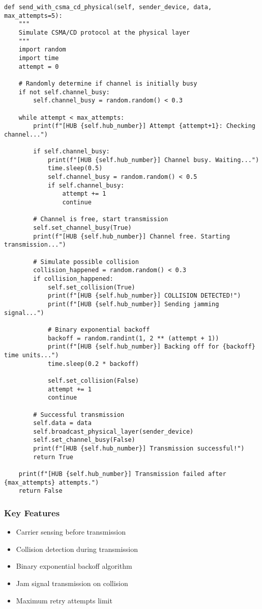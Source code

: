 \documentclass[12pt,a4paper]{article}
\begin{document}
\begin{lstlisting}[caption=CSMA/CD Implementation in Hub Class]
def send_with_csma_cd_physical(self, sender_device, data, max_attempts=5):
    """
    Simulate CSMA/CD protocol at the physical layer
    """
    import random
    import time
    attempt = 0
    
    # Randomly determine if channel is initially busy
    if not self.channel_busy:
        self.channel_busy = random.random() < 0.3
        
    while attempt < max_attempts:
        print(f"[HUB {self.hub_number}] Attempt {attempt+1}: Checking channel...")
        
        if self.channel_busy:
            print(f"[HUB {self.hub_number}] Channel busy. Waiting...")
            time.sleep(0.5)
            self.channel_busy = random.random() < 0.5
            if self.channel_busy:
                attempt += 1
                continue
                
        # Channel is free, start transmission
        self.set_channel_busy(True)
        print(f"[HUB {self.hub_number}] Channel free. Starting transmission...")
        
        # Simulate possible collision
        collision_happened = random.random() < 0.3
        if collision_happened:
            self.set_collision(True)
            print(f"[HUB {self.hub_number}] COLLISION DETECTED!")
            print(f"[HUB {self.hub_number}] Sending jamming signal...")
            
            # Binary exponential backoff
            backoff = random.randint(1, 2 ** (attempt + 1))
            print(f"[HUB {self.hub_number}] Backing off for {backoff} time units...")
            time.sleep(0.2 * backoff)
            
            self.set_collision(False)
            attempt += 1
            continue
            
        # Successful transmission
        self.data = data
        self.broadcast_physical_layer(sender_device)
        self.set_channel_busy(False)
        print(f"[HUB {self.hub_number}] Transmission successful!")
        return True
        
    print(f"[HUB {self.hub_number}] Transmission failed after {max_attempts} attempts.")
    return False
\end{lstlisting}

\subsubsection{Key Features}
\begin{itemize}
\item Carrier sensing before transmission
\item Collision detection during transmission
\item Binary exponential backoff algorithm
\item Jam signal transmission on collision
\item Maximum retry attempts limit
\end{itemize}
\end{document}
